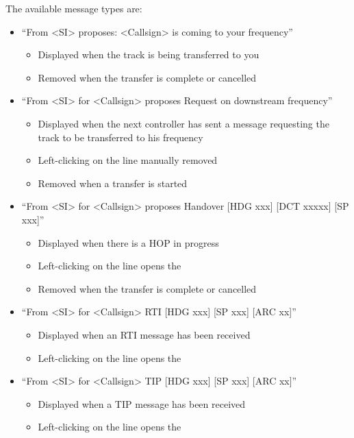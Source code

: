 \documentclass[11pt,a4paper,oldfontcommands]{memoir}
\begin{document}
The available message types are:

\begin{itemize} 
    \item “From <SI> proposes: <Callsign> is coming to your frequency”
         \begin{itemize} 
            \item Displayed when the track is being transferred to you
            \item Removed when the transfer is complete or cancelled
         \end{itemize}
    \item “From <SI> for <Callsign> proposes Request on downstream frequency”
         \begin{itemize}
            \item Displayed when the next controller has sent a message requesting the track to be transferred to his frequency
            \item Left-clicking on the line manually removed
            \item Removed when a transfer is started
         \end{itemize} 
    \item “From <SI> for <Callsign> proposes Handover [HDG xxx] [DCT xxxxx] [SP xxx]”
        \begin{itemize}
            \item Displayed when there is a HOP in progress
            \item Left-clicking on the line opens the \textit{}
            \item Removed when the transfer is complete or cancelled
        \end{itemize} 
    \item “From <SI> for <Callsign> RTI [HDG xxx] [SP xxx] [ARC xx]”
        \begin{itemize}
            \item Displayed when an RTI message has been received
            \item Left-clicking on the line opens the \textit{}
        \end{itemize} 
    \item “From <SI> for <Callsign> TIP [HDG xxx] [SP xxx] [ARC xx]”
        \begin{itemize}
            \item Displayed when a TIP message has been received
            \item Left-clicking on the line opens the \textit{}

\end{itemize}
\end{itemize}
\end{document}
